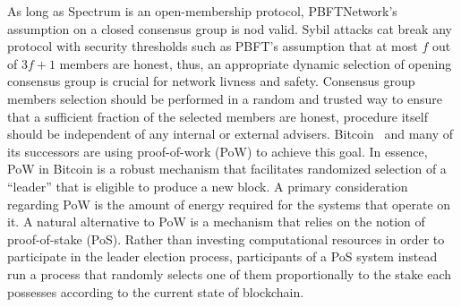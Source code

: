 As long as Spectrum is an open-membership protocol, PBFTNetwork's assumption on a closed consensus group is nod valid.
Sybil attacks cat break any protocol with security thresholds such as PBFT's assumption that at most $f$ out of ${3 f + 1}$ members are honest, thus, an appropriate dynamic selection of opening consensus group is crucial for network livness and safety.
Consensus group members selection should be performed in a random and trusted way to ensure that a sufficient fraction of the selected members are honest, procedure itself should be independent of any internal or external advisers.
Bitcoin~\cite{nakamoto2009bitcoin} and many of its successors are using proof-of-work (PoW) to achieve this goal.
In essence, PoW in Bitcoin is a robust mechanism that facilitates randomized selection of a \enquote{leader} that is eligible to produce a new block.
A primary consideration regarding PoW is the amount of energy required for the systems that operate on it.
A natural alternative to PoW is a mechanism that relies on the notion of proof-of-stake (PoS).
Rather than investing computational resources in order to participate in the leader election process, participants of a PoS system instead run a process that randomly selects one of them proportionally to the stake each possesses according to the current state of blockchain.
